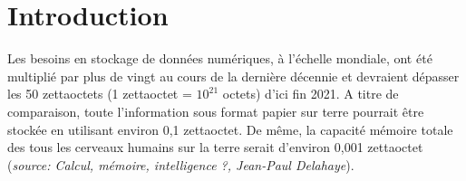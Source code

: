 


\vspace{-1cm}
\section{Introduction}
\vspace{-0.5cm}
Les besoins en stockage de données numériques, à l’échelle mondiale, ont été multiplié par plus de vingt au cours de la dernière décennie et devraient dépasser les 50 zettaoctets (1 zettaoctet = $10^{21}$ octets) d’ici fin 2021. A titre de comparaison, toute l'information sous format papier sur terre pourrait être stockée en utilisant environ 0,1 zettaoctet. De même, la capacité mémoire totale des tous les cerveaux humains sur la terre serait d'environ 0,001 zettaoctet (\textit{source: Calcul, mémoire, intelligence ?, Jean-Paul Delahaye}).

